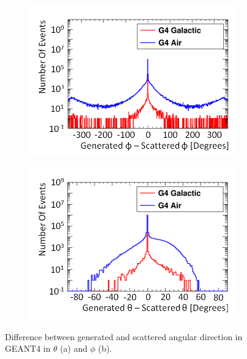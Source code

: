 \begin{figure}[!h]
\centering
\begin{subfigure}{.5\textwidth}
  \centering
  \includegraphics[width=\linewidth]{Chapter4/Figs/Raster/CryPlots/genPhi-scatPhiMedText.png}
  \captionsetup{width=.9\linewidth}
  \caption{}
  \label{subFig:genPhi-scatPhi}
\end{subfigure}%
\begin{subfigure}{.5\textwidth}
  \centering
  \includegraphics[width=\linewidth]{Chapter4/Figs/Raster/CryPlots/genTheta-scatThetaMedText.png}
  \captionsetup{width=.9\linewidth}
  \caption{}
  \label{subFig:genTheta-scatPhi}
\end{subfigure}
\caption[Difference between generated and scattered angular direction in GEANT4.]{Difference between generated and scattered angular direction in GEANT4 in $\theta$ (a) and $\phi$ (b).}
\label{fig:gen-scat_PhiTheta}
\end{figure}


